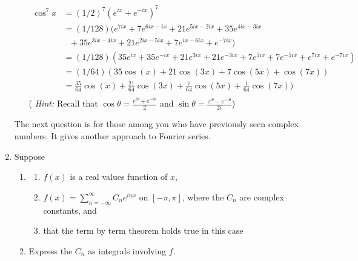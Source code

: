 \documentclass{article}
\begin{document}
\begin{enumerate}
\begin{enumerate}
\begin{align*}
\cos^7x &= (1/2)^7(e^{ix} + e^{-ix})^7 \\
&= (1/128)(e^{7ix} + 7e^{6ix-ix} + 21e^{5ix-2ix}+35e^{4ix-3ix} \\
& \: \: \: + 35e^{3ix-4ix} + 21e^{2ix-5ix} + 7e^{ix-6ix} + e^{-7ix} )\\
&= (1/128)(35e^{ix} + 35e^{-ix} + 21e^{3ix}+21e^{-3ix} +7e^{5ix} + 7e^{-5ix}+ e^{7ix} + e^{-7ix} )\\
&= (1/64)(35\cos(x) + 21\cos(3x) + 7\cos(5x) + \cos(7x))\\
&= \frac{35}{64}\cos(x) + \frac{21}{64}\cos(3x) + \frac{7}{64}\cos(5x) + \frac{1}{64}\cos(7x))\\
\end{align*}
( \textit{Hint:} Recall that $\cos \theta = \frac{e^{i\theta} + e^{-i\theta}}{2}$ and $\sin \theta = \frac{e^{i\theta} - e^{-i\theta}}{2i}$)
\end{enumerate}

The next question is for those among you who have previously seen complex numbers. It gives another approach to Fourier series.

\item Suppose
\begin{enumerate}
\item[] {}

\begin{enumerate}
\item $f(x)$ is a real values function of $x$,
\item $\displaystyle f(x) = \sum_{n=-\infty}^\infty C_ne^{inx}$ on $[-\pi, \pi ]$, where the $C_n$ are complex constants, and
\item that the term by term theorem holds true in this case
\end{enumerate}


\item Express the $C_n$ as integrals involving $f$.


\end{enumerate}
\end{enumerate}
\end{document}
